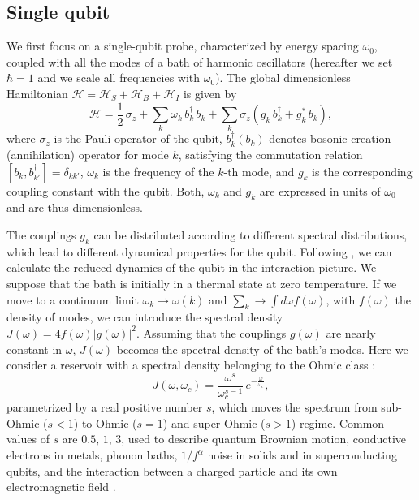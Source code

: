 \documentclass[ pra,a4paper,aps,twocolumn,superscriptaddress]{revtex4-1}
\def\tc#1{{\color{black}#1}}
\begin{document}
\subsection{Single qubit}
%
We first focus on a single-qubit probe, characterized by energy spacing 
$\omega_0$, coupled with all the modes of a bath of harmonic oscillators 
(hereafter we set $\hbar=1$ \tc{and we scale all frequencies with $\omega_0$}).
The global \tc{dimensionless 
Hamiltonian $\mathcal{H}=\mathcal{H}_S+\mathcal{H}_B+\mathcal{H}_I$ is given by
\begin{equation}
\mathcal{H}=\frac{1}{2}\, \sigma_{z}+\sum_{k} \omega_{k}\,b_{k}^\dagger\,b_{k}+
\sum_{k}\sigma_{z}(g_{k}\,b_{k}^\dagger+g_{k}^\ast\,b_{k}),
\end{equation}
where $\sigma_z$ is the Pauli operator of the qubit, $b_k^{\dagger}(b_k)$ 
denotes bosonic creation (annihilation) operator for mode $k$, 
satisfying the commutation relation $ [b_{k},b_{k'}^\dagger]=\delta_{kk'}$,  
$\omega_k$ is the frequency of the $k$-th mode, and 
$g_k$ is the corresponding coupling constant with the qubit. Both, $\omega_k$ and $g_k$ are expressed in units of $\omega_0$ and are thus dimensionless.}
\par
%
The couplings $g_{k}$ can be distributed according to different spectral distributions, 
which lead to different dynamical properties for the qubit. 
Following \cite{breuer2002theory,palma96}, we can calculate the reduced 
dynamics of the qubit in the interaction picture.
We suppose that the bath is initially in a thermal state at zero 
temperature. If we move to a continuum limit  $\omega_k\rightarrow 
\omega(k)$ and $\sum_k\rightarrow \int d\omega f(\omega)$, with 
$f(\omega)$  the density of modes, we can 
introduce the  spectral density $J(\omega)=4 f(\omega) |g(\omega)|^2$.
Assuming that the couplings $g(\omega)$ are nearly constant in $\omega$,
$J(\omega)$ becomes the spectral density of the bath's modes.  
Here we consider a reservoir  with a spectral density 
belonging to the Ohmic class
 :
\begin{equation}
J(\omega,\omega_c)=\frac{\omega^{s}}{\omega_{c}^{s-1}}\,e^{-\frac{	\omega}{	\omega_{c}}},
\label{Jomega}
\end{equation}
parametrized by a real positive number  $s$, which moves the spectrum from sub-Ohmic
 ($s < 1$) to Ohmic ($ s = 1$) and super-Ohmic ($s > 1$) regime.  
 \tc{Common values of $s$ are $0.5,\,1,\,3$, used to describe  quantum Brownian motion,
 conductive electrons in metals, phonon baths, $1/f^{\alpha}$ noise in solids and in superconducting qubits,  and the interaction between a charged particle and its own electromagnetic field \cite{weiss, paavola, barone91, benedettif}.
 }
\end{document}
